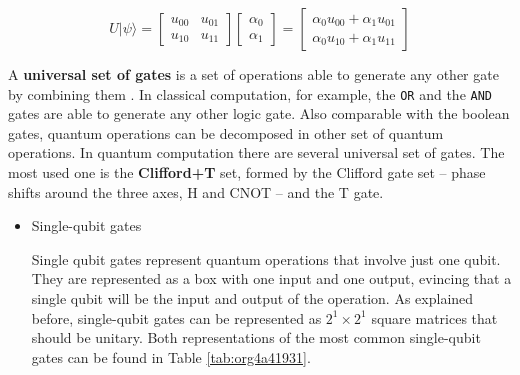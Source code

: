 \begin{itemize}
\begin{equation}
\label{eq:org0aebd66}
U |\psi\rangle=\begin{bmatrix}u_{00}&u_{01}\\u_{10}&u_{11}\end{bmatrix} \begin{bmatrix}\alpha_0 \\ \alpha_1 \end{bmatrix} = \begin{bmatrix}\alpha_0 u_{00} + \alpha_1 u_{01} \\ \alpha_0 u_{10} + \alpha_1 u_{11} \end{bmatrix}
\end{equation}

A \textbf{universal set of gates} is a set of operations able to generate any other gate by combining them \cite{Nielsen_2009}.
In classical computation, for example, the \texttt{OR} and the \texttt{AND} gates are able to generate any other logic gate.
Also comparable with the boolean gates, quantum operations can be decomposed in other set of quantum operations.
In quantum computation there are several universal set of gates.
The most used one is the \textbf{Clifford+T} set, formed by the Clifford gate set -- phase shifts around the three axes, H and CNOT -- and the T gate.

\begin{itemize}
\item Single-qubit gates
\label{sec:org83e275f}

Single qubit gates represent quantum operations that involve just one qubit.
They are represented as a box with one input and one output, evincing that a single qubit will be the input and output of the operation.
As explained before, single-qubit gates can be represented as \(2^1 \times 2^1\) square matrices that should be unitary.
Both representations of the most common single-qubit gates can be found in Table \ref{tab:org4a41931}.


\end{itemize}
\end{itemize}
